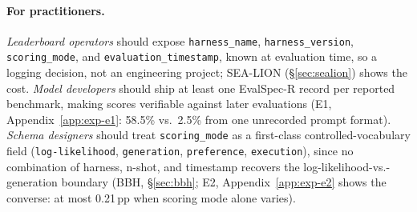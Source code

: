 \documentclass[11pt]{article}
\begin{document}
%
%
%

\paragraph{For practitioners.}
\emph{Leaderboard operators} should expose \texttt{harness\_name},
\texttt{harness\_version}, \texttt{scoring\_mode}, and
\texttt{evaluation\_timestamp}, known at evaluation time, so a logging decision,
not an engineering project; SEA-LION (\S\ref{sec:sealion}) shows the cost.
\emph{Model developers}
should ship at least one EvalSpec-R record per reported benchmark, making scores
verifiable against later evaluations (E1, Appendix~\ref{app:exp-e1}:
58.5\% vs.\ 2.5\% from one unrecorded prompt format). \emph{Schema designers}
should treat \texttt{scoring\_mode} as a first-class controlled-vocabulary field
(\texttt{log-likelihood}, \texttt{generation}, \texttt{preference},
\texttt{execution}), since no combination of harness, n-shot, and timestamp
recovers the log-likelihood-vs.-generation boundary (BBH, \S\ref{sec:bbh}; E2,
Appendix~\ref{app:exp-e2} shows the converse: at most 0.21\,pp when scoring
mode alone varies).
\end{document}
